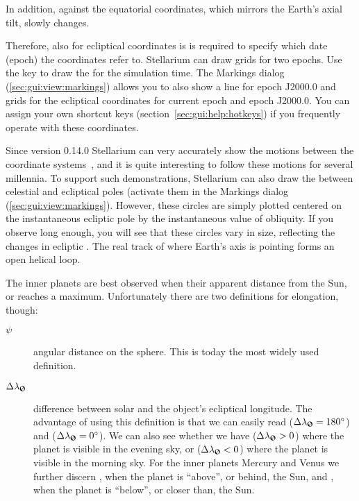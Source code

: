 In addition,  against the equatorial coordinates,
which mirrors the Earth's axial tilt, slowly changes.

Therefore, also for ecliptical coordinates is is required to specify
which date (epoch) the coordinates refer to.  Stellarium can draw grids
for two epochs. Use the \key{,} key to draw the 
for the simulation time. The Markings dialog
(\ref{sec:gui:view:markings}) allows you to also show a line for epoch
J2000.0 and grids for the ecliptical coordinates for current epoch and
epoch J2000.0. You can assign your own shortcut keys
(section~\ref{sec:gui:help:hotkeys}) if you frequently operate with
these coordinates.

Since version 0.14.0 Stellarium can very accurately show the motions
between the coordinate systems~\citep{2011AA:Vondrak, 2012AA:Vondrak}, and it is quite
interesting to follow these motions for several millennia. To support
such demonstrations, Stellarium can also draw the
 between celestial and ecliptical poles
(activate them in the Markings dialog (\ref{sec:gui:view:markings}).
However, these circles are simply plotted centered on the instantaneous
ecliptic pole by the instantaneous value of obliquity. 
If you observe long enough, you will
see that these circles vary in size, reflecting the changes in
ecliptic . The real track of where Earth's axis is pointing forms an open helical loop.

The inner planets are best observed when their apparent distance from
the Sun, or  reaches a maximum. Unfortunately
there are two definitions for elongation, though:
\begin{description}
\item[$\psi$] angular distance on the sphere. This is today the most widely used definition.
\item[$\Delta\lambda_{\text{\Sun}}$] difference between solar and the
  object's ecliptical longitude. The advantage of using this
  definition is that we can easily read 
  ($\Delta\lambda_{\text{\Sun}}=180^\circ$) and 
  ($\Delta\lambda_{\text{\Sun}}=0^\circ$). We can also see whether we have
   ($\Delta\lambda_{\text{\Sun}}>0$) where the planet is visible in the evening sky, or
   ($\Delta\lambda_{\text{\Sun}}<0$) where the planet is visible in the morning sky.
  For the inner planets Mercury and Venus
  we further discern , when the planet is ``above'', or behind, the Sun,
  and , when
  the planet is ``below'', or closer than, the Sun.
\end{description}


